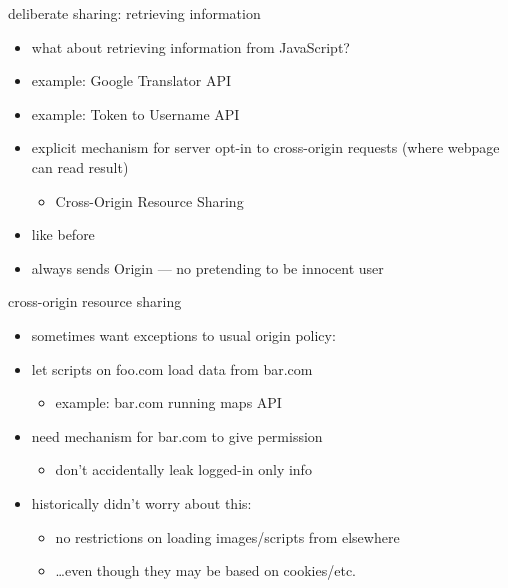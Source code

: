 
\begin{frame}{deliberate sharing: retrieving information}
    \begin{itemize}
    \item what about retrieving information from JavaScript?
    \item example: Google Translator API
    \item example: Token to Username API
    \vspace{.5cm}
    \item explicit mechanism for server opt-in to cross-origin requests (where webpage can read result)
        \begin{itemize}
        \item Cross-Origin Resource Sharing
        \end{itemize}
    \item {} like before
    \item always sends Origin --- no pretending to be innocent user
    \end{itemize}
\end{frame}


\begin{frame}{cross-origin resource sharing}
    \begin{itemize}
    \item sometimes want exceptions to usual origin policy:
    \vspace{.5cm}
    \item let scripts on foo.com load data from bar.com
        \begin{itemize}
        \item example: bar.com running maps API
        \end{itemize}
    \item need mechanism for bar.com to give permission
        \begin{itemize}
        \item don't accidentally leak logged-in only info
        \end{itemize}
    \item historically didn't worry about this:
        \begin{itemize}
        \item no restrictions on loading images/scripts from elsewhere
        \item \ldots even though they may be based on cookies/etc.
        \end{itemize}
    \end{itemize}
\end{frame}

